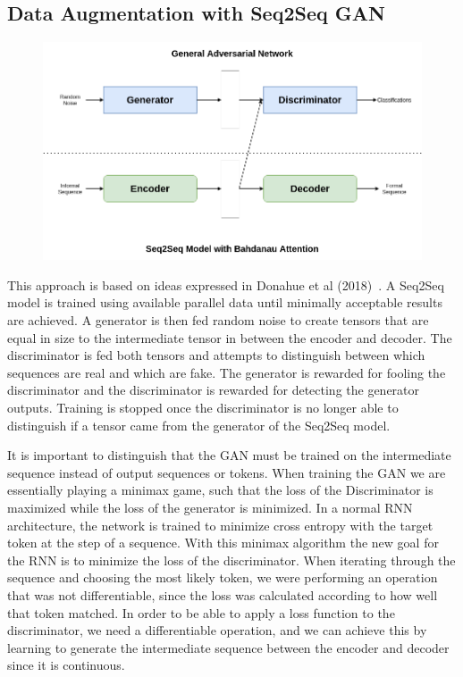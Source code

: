 \documentclass[12pt]{article}
\begin{document}
\subsection{Data Augmentation with Seq2Seq GAN}
\begin{figure}[t]
    \centering
    \includegraphics[scale=0.4]{GAN Generation.png}
\end{figure}
This approach is based on ideas expressed in 
Donahue et al (2018)~\cite{ganpaper}. A Seq2Seq model is trained 
using available parallel data until minimally acceptable results are achieved.
A generator is then fed random noise to create tensors that are equal in size to the 
intermediate tensor in between the encoder and decoder. The discriminator is fed both 
tensors and attempts to distinguish between which sequences are real and which are fake. 
The generator is rewarded for fooling the discriminator and the discriminator is rewarded
for detecting the generator outputs. Training is stopped once the discriminator is no 
longer able to distinguish if a tensor came from the generator of the Seq2Seq model. \par 

It is important to distinguish that the GAN must be trained on the intermediate sequence
instead of output sequences or tokens. When training the GAN we are essentially playing a 
minimax game, such that the loss of the Discriminator is maximized while the loss of the
generator is minimized. In a normal RNN architecture, the network is trained to minimize 
cross entropy with the target token at the step of a sequence. With this minimax algorithm 
the new goal for the RNN is to minimize the loss of the discriminator. When iterating 
through the sequence and choosing the most likely token, we were performing an operation 
that was not differentiable, since the loss was calculated according to how well that token
matched. In order to be able to apply a loss function to the discriminator, we need a 
differentiable operation, and we can achieve this by learning to generate the intermediate
sequence between the encoder and decoder since it is continuous. 
\end{document}
